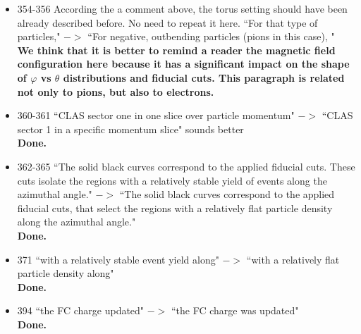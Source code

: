 \documentclass[,superscriptaddress,showpacs,amssymb,amsmath,amsfonts,linenumbers,article]{revtex4-1}
\begin{document}
\begin{itemize}
\item 354-356 According the a comment above, the torus setting should have been already described before. No need to repeat it here. ``For that type of particles," $->$ ``For negative, outbending particles (pions in this case), "\\
{\bf We think that it is better to remind a reader the magnetic field configuration here because it has a significant impact on the shape of $\varphi$ vs $\theta$ distributions and fiducial cuts. This paragraph is related not only to pions, but also to electrons. 
}

\item 360-361 ``CLAS sector one in one slice over particle momentum" $->$ ``CLAS sector 1 in a specific momentum slice" sounds better\\
{\bf Done.}

\item 362-365 ``The solid black curves correspond to the applied fiducial cuts. These cuts isolate the regions with a relatively stable yield of events along the azimuthal angle." $->$ ``The solid black curves correspond to the applied fiducial cuts, that select the regions with a relatively flat particle density along the azimuthal angle."\\
{\bf Done.}

\item 371 ``with a relatively stable event yield along" $->$ ``with a relatively flat particle density along"\\
{\bf Done.}

\item 394 ``the FC charge updated" $->$ ``the FC charge was updated"\\[0.5cm]
{\bf Done.}


\end{itemize}
\end{document}
